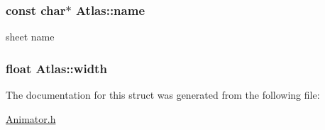 \hypertarget{struct_atlas_aaf174bab6442ce9047719a2c55486f17}{}
\subsubsection[{name}]{\setlength{\rightskip}{0pt plus 5cm}const char$\ast$ Atlas\+::name}\label{struct_atlas_aaf174bab6442ce9047719a2c55486f17}


sheet name 

\hypertarget{struct_atlas_a36a6e8a95974a952eda85a38e30eb50d}{}
\subsubsection[{width}]{\setlength{\rightskip}{0pt plus 5cm}float Atlas\+::width}\label{struct_atlas_a36a6e8a95974a952eda85a38e30eb50d}


The documentation for this struct was generated from the following file\+:\begin{DoxyCompactItemize}
\item 
\hyperlink{_animator_8h}{Animator.\+h}\end{DoxyCompactItemize}

